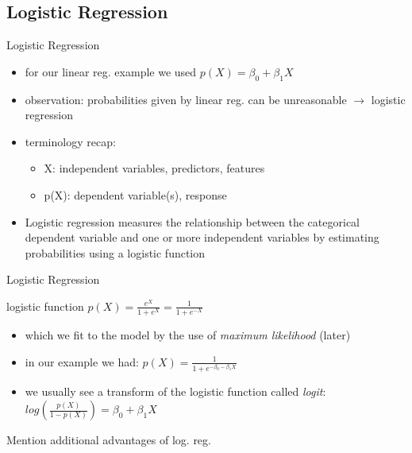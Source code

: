 \documentclass{beamer}
\begin{document}
\subsection{Logistic Regression}
\begin{frame}{Logistic Regression}
\begin{itemize}
\item for our linear reg. example we used $p(X) = \beta_0 + \beta_1X$
\item observation: probabilities given by linear reg. can be unreasonable $\rightarrow$ logistic regression
\item terminology recap:
  \begin{itemize}
  	\item X: independent variables, predictors, features
  	\item p(X): dependent variable(s), response 
  \end{itemize}
\item Logistic regression measures the relationship between the categorical dependent variable and one or more independent variables by estimating probabilities using a logistic function
\end{itemize}
\end{frame}

\begin{frame}{Logistic Regression}

\begin{block}{logistic function}
$p(X) = \frac{e^X}{1+e^X} = \frac{1}{1+e^{-X}}$ 
\end{block}
\begin{itemize}
\item which we fit to the model by the use of \emph{maximum likelihood} (later)
\item in our example we had: $p(X) = \frac{1}{1+e^{-\beta_0 - \beta_1X}}$
\item we usually see a transform of the logistic function called \emph{logit}:\\ 
	$log(\frac{p(X)}{1-p(X)}) = \beta_0 + \beta_1X$
\end{itemize}
\end{frame}

\begin{frame}
Mention additional advantages of log. reg.
\end{frame}

\newpage


\end{document}
